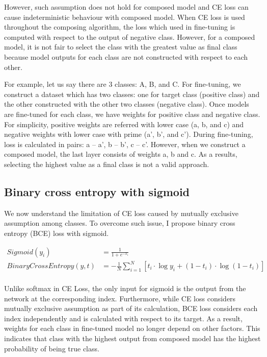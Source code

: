 \documentclass{article}
\begin{document}
However, such assumption does not hold for composed model and CE loss can cause indeterministic behaviour with composed model. When CE loss is used throughout the composing algorithm, the loss which used in fine-tuning is computed with respect to the output of negative class. However, for a composed model, it is not fair to select the class with the greatest value as final class because model outputs for each class are not constructed with respect to each other.

For example, let us say there are 3 classes: A, B, and C. For fine-tuning, we construct a dataset which has two classes: one for target class (positive class) and the other constructed with the other two classes (negative class). Once models are fine-tuned for each class, we have weights for positive class and negative class. For simplicity, positive weights are referred with lower case (a, b, and c) and negative weights with lower case with prime (a', b', and c'). During fine-tuning, loss is calculated in pairs: a -- a', b -- b', c -- c'. However, when we construct a composed model, the last layer consists of weights a, b and c. As a results, selecting the highest value as a final class is not a valid approach.

\subsection{Binary cross entropy with sigmoid}

We now understand the limitation of CE loss caused by mutually exclusive assumption among classes. To overcome such issue, I propose binary cross entropy (BCE) loss with sigmoid.

\begin{align*}
Sigmoid(y_i) &= \frac{1}{1 + e^{-x_i}} \\
BinaryCrossEntropy(y, t) & = -\frac{1}{N}\sum_{i=1}^N \left[ t_i \cdot \log y_i + (1 - t_i) \cdot \log (1 - t_i) \right] \\
\end{align*}

Unlike softmax in CE Loss, the only input for sigmoid is the output from the network at the corresponding index. Furthermore, while CE loss considers mutually exclusive assumption as part of its calculation, BCE loss considers each index independently and is calculated with respect to its target. As a result, weights for each class in fine-tuned model no longer depend on other factors. This indicates that class with the highest output from composed model has the highest probability of being true class.
\end{document}
